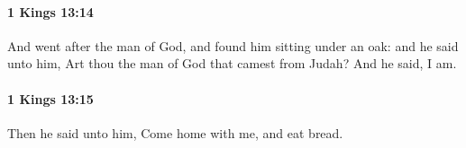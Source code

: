 		\paragraph{1 Kings 13:14} %
			\label{1KINGS-13-14}

			And went after the man of God, and found him sitting under an oak: and he said unto him, Art thou the man of God that camest from Judah? And he said, I am.


		\paragraph{1 Kings 13:15} %
			\label{1KINGS-13-15}

			Then he said unto him, Come home with me, and eat bread.


